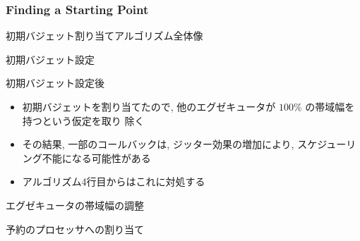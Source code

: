 \subsubsection{Finding a Starting Point}
\label{sssec: finding a starting point}

\begin{frame}{初期バジェット割り当てアルゴリズム全体像}
\end{frame}


\begin{frame}{初期バジェット設定}
\end{frame}

\begin{frame}{初期バジェット設定後}
    \begin{itemize}
        \item 初期バジェットを割り当てたので, 他のエグゼキュータが $100 \%$ の帯域幅を持つという仮定を取り 除く
        \item その結果, 一部のコールバックは, ジッター効果の増加により, スケジューリング不能になる可能性がある
        \item アルゴリズム4行目からはこれに対処する
    \end{itemize}
\end{frame}

\begin{frame}{エグゼキュータの帯域幅の調整}
\end{frame}

\begin{frame}{予約のプロセッサへの割り当て}
\end{frame}



